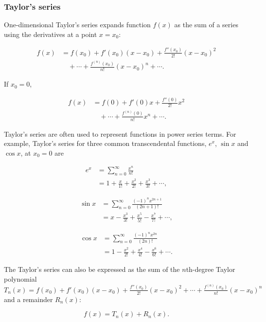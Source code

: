 \subsubsection*{Taylor's series}

One-dimensional Taylor's series expands function $f(x)$ as the sum of a series using the
derivatives at a point $x=x_0$:

\[
  \begin{aligned}
  f(x)&=f(x_0)+f'(x_0)(x-x_0)+\frac{f''(x_0)}{2!}(x-x_0)^2\\
  &\quad+\cdots+\frac{f^{(n)}(x_0)}{n!}(x-x_0)^n+\cdots.
  \end{aligned}
\]

If $x_0=0$,

\[
  \begin{aligned}
  f(x)&=f(0)+f'(0)x+\frac{f''(0)}{2!}x^2\\
  &\quad+\cdots+\frac{f^{(n)}(0)}{n!}x^n+\cdots.
  \end{aligned}
\]

Taylor's series are often used to represent functions in power series terms. For example,
Taylor's series for three common transcendental functions, $e^x$, $\sin x$ and $\cos x$, at
$x_0=0$ are

\[
  \begin{aligned}
  e^x&=\sum_{n=0}^{\infty}\frac{x^n}{n!}\\
  &=1+\frac{x}{1!}+\frac{x^2}{2!}+\frac{x^3}{3!}+\cdots,
  \end{aligned}
\]

\[
  \begin{aligned}
  \sin x&=\sum_{n=0}^{\infty}\frac{(-1)^n x^{2n+1}}{(2n+1)!}\\
  &=x-\frac{x^3}{3!}+\frac{x^5}{5!}-\frac{x^7}{7!}+\cdots,
  \end{aligned}
\]

\[
  \begin{aligned}
  \cos x&=\sum_{n=0}^{\infty}\frac{(-1)^n x^{2n}}{(2n)!}\\
  &=1-\frac{x^2}{2!}+\frac{x^4}{4!}-\frac{x^6}{6!}+\cdots.
  \end{aligned}
\]

The Taylor's series can also be expressed as the sum of the $n$th-degree Taylor polynomial
$T_n(x)=f(x_0)+f'(x_0)(x-x_0)+\frac{f''(x_0)}{2!}(x-x_0)^2+\cdots+
\frac{f^{(n)}(x_0)}{n!}(x-x_0)^n$ and a remainder $R_n(x)$:

\[
  f(x)=T_n(x)+R_n(x).
\]

